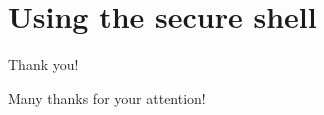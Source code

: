 \documentclass[10pt]{vcs_beamer}
\begin{document}


\section{Using the secure shell}








\begin{frame}{Thank you!}
\begin{center}
\huge
Many thanks for your attention!  \ttt{:-)}
\end{center}
\end{frame}
\end{document}
